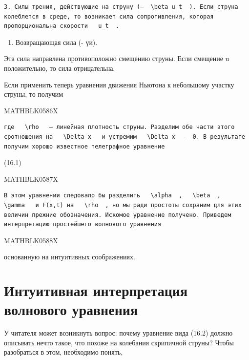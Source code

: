 \documentclass[
]{article}
\providecommand{\tightlist}{%
  \setlength{\itemsep}{0pt}\setlength{\parskip}{0pt}}
\begin{document}
{{\begin{verbatim}
3. Силы трения, действующие на струну (—  \beta u_t  ). Если струна колеблется в среде, то возникает сила сопротивления, которая пропорциональна скорости   u_t  .
\end{verbatim}

\begin{enumerate}
\def\labelenumi{\arabic{enumi}.}
\setcounter{enumi}{3}
\tightlist
\item
  Возвращающая сила (- үи).
\end{enumerate}

Эта сила направлена противоположно смещению струны. Если смещение u
положительно, то сила отрицательна.

Если применить теперь уравнения движения Ньютона к небольшому участку
струны, то получим

MATHBLK0586X

\begin{verbatim}
где   \rho   — линейная плотность струны. Разделим обе части этого сротношения на   \Delta x   и устремим   \Delta x   — 0. В результате получим хорошо известное телеграфное уравнение
\end{verbatim}

(16.1)

MATHBLK0587X

\begin{verbatim}
В этом уравнении следовало бы разделить   \alpha  ,   \beta  ,   \gamma   и F(x,t) на   \rho  , но мы ради простоты сохраним для этих величин прежние обозначения. Искомое уравнение получено. Приведем интерпретацию простейшего волнового уравнения
\end{verbatim}

MATHBLK0588X

основанную на интуитивных соображениях.

\section{Интуитивная интерпретация волнового
уравнения}\label{ux438ux43dux442ux443ux438ux442ux438ux432ux43dux430ux44f-ux438ux43dux442ux435ux440ux43fux440ux435ux442ux430ux446ux438ux44f-ux432ux43eux43bux43dux43eux432ux43eux433ux43e-ux443ux440ux430ux432ux43dux435ux43dux438ux44f}

У читателя может возникнуть вопрос: почему уравнение вида (16.2) должно
описывать нечто такое, что похоже на колебания скрипичной струны? Чтобы
разобраться в этом, необходимо понять,

}}
\end{document}
